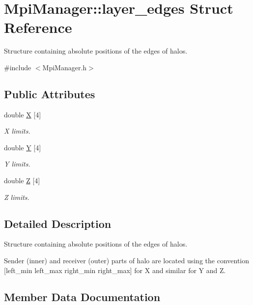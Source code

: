 \hypertarget{struct_mpi_manager_1_1layer__edges}{}\section{Mpi\+Manager\+:\+:layer\+\_\+edges Struct Reference}
\label{struct_mpi_manager_1_1layer__edges}


Structure containing absolute positions of the edges of halos.  




{\ttfamily \#include $<$Mpi\+Manager.\+h$>$}

\subsection*{Public Attributes}
\begin{DoxyCompactItemize}
\item 
double \hyperlink{struct_mpi_manager_1_1layer__edges_a9f79fa4b504f2d4418f2bc4747cc908c}{X} \mbox{[}4\mbox{]}
\begin{DoxyCompactList}\small\item\em X limits. \end{DoxyCompactList}\item 
double \hyperlink{struct_mpi_manager_1_1layer__edges_aa4d880e027a6410ff4b34e28dcd1f9d4}{Y} \mbox{[}4\mbox{]}
\begin{DoxyCompactList}\small\item\em Y limits. \end{DoxyCompactList}\item 
double \hyperlink{struct_mpi_manager_1_1layer__edges_a25eea1176a0c06c1e25a7a08b8840283}{Z} \mbox{[}4\mbox{]}
\begin{DoxyCompactList}\small\item\em Z limits. \end{DoxyCompactList}\end{DoxyCompactItemize}


\subsection{Detailed Description}
Structure containing absolute positions of the edges of halos. 

Sender (inner) and receiver (outer) parts of halo are located using the convention \mbox{[}left\+\_\+min left\+\_\+max right\+\_\+min right\+\_\+max\mbox{]} for X and similar for Y and Z. 

\subsection{Member Data Documentation}
